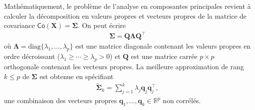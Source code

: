 \documentclass[
  11pt,
  letterpaper,
]{scrbook}
\theoremstyle{definition}
\theoremstyle{remark}
\begin{document}
Mathématiquement, le problème de l'analyse en composantes principales
revient à calculer la décomposition en valeurs propres et vecteurs
propres de la matrice de covariance
\(\mathsf{Co}(\boldsymbol{X})=\boldsymbol{\Sigma}\). On peut écrire
\begin{align*}
\boldsymbol{\Sigma} = \boldsymbol{Q}\boldsymbol{\Lambda}\boldsymbol{Q}^\top
\end{align*} où
\(\boldsymbol{\Lambda} = \mathrm{diag}\{\lambda_1, \ldots, \lambda_p\}\)
est une matrice diagonale contenant les valeurs propres en ordre
décroissant (\(\lambda_1 \geq \cdots \geq \lambda_p > 0\)) et
\(\boldsymbol{Q}\) est une matrice carrée \(p \times p\) orthogonale
contenant les vecteurs propres. La meilleure approximation de rang
\(k \leq p\) de \(\boldsymbol{\Sigma}\) est obtenue en spécifiant
\begin{align*}
\widetilde{\boldsymbol{\Sigma}}_k = \sum_{j=1}^k \lambda_j \boldsymbol{q}_j\boldsymbol{q}_j^\top,
\end{align*} une combinaison des vecteurs propres
\(\boldsymbol{q}_1, \ldots, \boldsymbol{q}_k \in \mathbb{R}^p\) non
corrélés.
\end{document}
